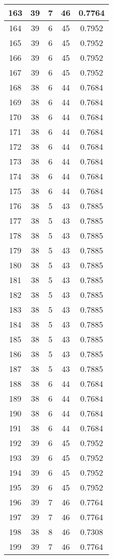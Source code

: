 \documentclass[letterpaper, 12pt]{article}
\begin{document}
\begin{longtable}{|c|c|c|c|c|}
\hline
163 & 39 & 7 & 46 & 0.7764 \\
\hline
164 & 39 & 6 & 45 & 0.7952 \\
\hline
165 & 39 & 6 & 45 & 0.7952 \\
\hline
166 & 39 & 6 & 45 & 0.7952 \\
\hline
167 & 39 & 6 & 45 & 0.7952 \\
\hline
168 & 38 & 6 & 44 & 0.7684 \\
\hline
169 & 38 & 6 & 44 & 0.7684 \\
\hline
170 & 38 & 6 & 44 & 0.7684 \\
\hline
171 & 38 & 6 & 44 & 0.7684 \\
\hline
172 & 38 & 6 & 44 & 0.7684 \\
\hline
173 & 38 & 6 & 44 & 0.7684 \\
\hline
174 & 38 & 6 & 44 & 0.7684 \\
\hline
175 & 38 & 6 & 44 & 0.7684 \\
\hline
176 & 38 & 5 & 43 & 0.7885 \\
\hline
177 & 38 & 5 & 43 & 0.7885 \\
\hline
178 & 38 & 5 & 43 & 0.7885 \\
\hline
179 & 38 & 5 & 43 & 0.7885 \\
\hline
180 & 38 & 5 & 43 & 0.7885 \\
\hline
181 & 38 & 5 & 43 & 0.7885 \\
\hline
182 & 38 & 5 & 43 & 0.7885 \\
\hline
183 & 38 & 5 & 43 & 0.7885 \\
\hline
184 & 38 & 5 & 43 & 0.7885 \\
\hline
185 & 38 & 5 & 43 & 0.7885 \\
\hline
186 & 38 & 5 & 43 & 0.7885 \\
\hline
187 & 38 & 5 & 43 & 0.7885 \\
\hline
188 & 38 & 6 & 44 & 0.7684 \\
\hline
189 & 38 & 6 & 44 & 0.7684 \\
\hline
190 & 38 & 6 & 44 & 0.7684 \\
\hline
191 & 38 & 6 & 44 & 0.7684 \\
\hline
192 & 39 & 6 & 45 & 0.7952 \\
\hline
193 & 39 & 6 & 45 & 0.7952 \\
\hline
194 & 39 & 6 & 45 & 0.7952 \\
\hline
195 & 39 & 6 & 45 & 0.7952 \\
\hline
196 & 39 & 7 & 46 & 0.7764 \\
\hline
197 & 39 & 7 & 46 & 0.7764 \\
\hline
198 & 38 & 8 & 46 & 0.7308 \\
\hline
199 & 39 & 7 & 46 & 0.7764 \\
\hline
\end{longtable}
\end{document}
